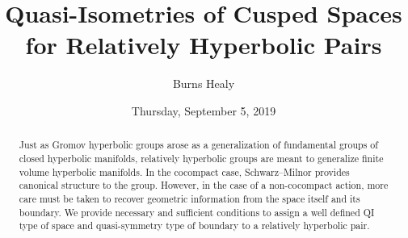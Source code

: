 \documentclass{UAmathtalk}
\author{Burns Healy}
\title{Quasi-Isometries of Cusped Spaces\\ for Relatively Hyperbolic Pairs}
\date{Thursday, September 5, 2019}
\begin{document}
\maketitle

\begin{abstract}
Just as Gromov hyperbolic groups arose as a generalization of fundamental groups of closed hyperbolic manifolds, relatively hyperbolic groups are meant to generalize finite volume hyperbolic manifolds. In the cocompact case, Schwarz--Milnor provides canonical structure to the group. However, in the case of a non-cocompact action, more care must be taken to recover geometric information from the space itself and its boundary. We provide necessary and sufficient conditions to assign a well defined QI type of space and quasi-symmetry type of boundary to a relatively hyperbolic pair.
\end{abstract}
\end{document}
